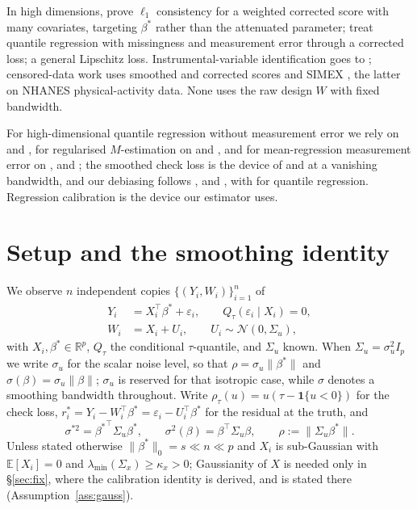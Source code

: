 \documentclass[12pt,a4paper]{article}
\theoremstyle{definition}
\theoremstyle{remark}
\newcommand{\R}{\mathbb{R}}
\newcommand{\E}{\mathbb{E}}
\newcommand{\cN}{\mathcal{N}}
\newcommand{\ind}[1]{\mathbf{1}\{#1\}}
\newcommand{\norm}[1]{\|#1\|}
\newcommand{\betas}{\beta^*}
\begin{document}
In high dimensions, \citet{kaul2015weighted} prove $\ell_1$ consistency for a weighted
corrected score with many covariates, targeting $\betas$ rather than the attenuated
parameter; \citet{bai2021variable} treat quantile regression with
missingness and measurement error through a corrected loss; \citet{ma2022highdim} a general
Lipschitz loss. Instrumental-variable identification goes to \citet{schennach2008quantile};
censored-data work uses smoothed and corrected scores \citep{ma2011censored,wu2015smoothed}
and SIMEX \citep{shang2012measurement,tekwe2022estimation}, the latter on NHANES
physical-activity data. None uses the raw design $W$ with fixed bandwidth.

For high-dimensional quantile regression without measurement error we rely on
\citet{belloni2011l1} and \citet{wang2012}, for regularised $M$-estimation on
\citet{negahban2012unified} and \citet{buhlmann2011statistics}, and for mean-regression
measurement error on \citet{rosenbaum2010}, \citet{datta2017cocolasso} and
\citet{loh2012highdim}; the smoothed check loss is the device of
\citet{fernandes2021smoothing} and \citet{he2023smoothed} at a vanishing bandwidth, and our
debiasing follows \citet{zhang2014confidence},
\citet{vandegeer2014asymptotically} and \citet{javanmard2014hypothesis}, with
\citet{bradic2017uniform} for quantile regression. Regression calibration
\citep{carroll2006measurement} is the device our estimator uses.

\section{Setup and the smoothing identity}
\label{sec:setup}

We observe $n$ independent copies $\{(Y_i,W_i)\}_{i=1}^n$ of
\begin{align}
Y_i &= X_i^\top\betas + \varepsilon_i, \qquad Q_\tau(\varepsilon_i\mid X_i) = 0,
\label{eq:model}\\
W_i &= X_i + U_i, \qquad U_i \sim \cN(0,\Sigma_u),
\label{eq:me}
\end{align}
with $X_i,\betas\in\R^p$, $Q_\tau$ the conditional $\tau$-quantile, and $\Sigma_u$ known.
When $\Sigma_u=\sigma_u^2I_p$ we write $\sigma_u$ for the scalar noise level, so that
$\rho=\sigma_u\norm{\betas}$ and $\sigma(\beta)=\sigma_u\norm{\beta}$; $\sigma_u$ is
reserved for that isotropic case, while $\sigma$ denotes a smoothing bandwidth throughout.
Write $\rho_\tau(u) = u(\tau-\ind{u<0})$ for the check loss,
$r_i^* = Y_i - W_i^\top\betas = \varepsilon_i - U_i^\top\betas$ for the residual at the
truth, and
\begin{equation}
\sigma^{*2} = {\betas}^\top\Sigma_u\betas,\qquad
\sigma^2(\beta) = \beta^\top\Sigma_u\beta ,
\qquad
\rho := \norm{\Sigma_u\betas} .
\label{eq:rho}
\end{equation}
Unless stated otherwise $\|\betas\|_0 = s \ll n \ll p$ and $X_i$ is sub-Gaussian with
$\E[X_i]=0$ and $\lambda_{\min}(\Sigma_x)\ge\kappa_x>0$; Gaussianity of $X$ is needed only
in \S\ref{sec:fix}, where the calibration identity is derived, and is stated there
(Assumption~\ref{ass:gauss}).
\end{document}
